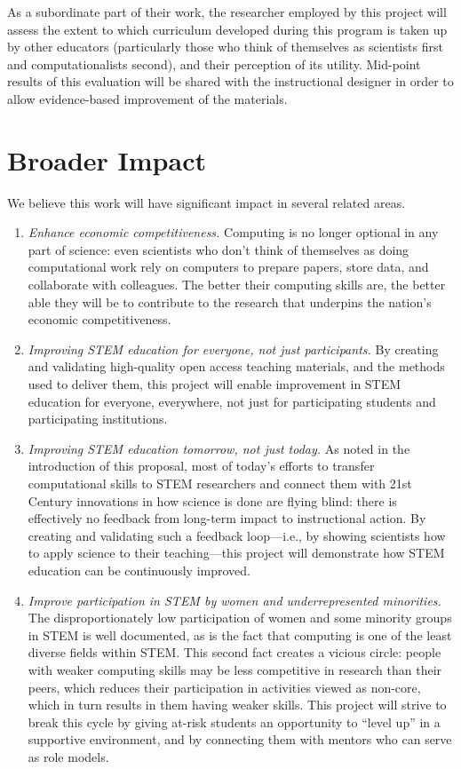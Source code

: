 \documentclass[11pt]{article}
\begin{document}
As a subordinate part of their work, the researcher employed by this
project will assess the extent to which curriculum developed during
this program is taken up by other educators (particularly those who
think of themselves as scientists first and computationalists second),
and their perception of its utility.  Mid-point results of this
evaluation will be shared with the instructional designer in order to
allow evidence-based improvement of the materials.

\section{Broader Impact}

We believe this work will have significant impact in several related
areas.

\begin{enumerate}

\item
  \emph{Enhance economic competitiveness.} Computing is no longer
  optional in any part of science: even scientists who don't think of
  themselves as doing computational work rely on computers to prepare
  papers, store data, and collaborate with colleagues.  The better
  their computing skills are, the better able they will be to
  contribute to the research that underpins the nation's economic
  competitiveness.

\item
  \emph{Improving STEM education for everyone, not just participants.}
  By creating and validating high-quality open access teaching
  materials, and the methods used to deliver them, this project will
  enable improvement in STEM education for everyone, everywhere, not
  just for participating students and participating institutions.

\item
  \emph{Improving STEM education tomorrow, not just today.}  As noted
  in the introduction of this proposal, most of today's efforts to
  transfer computational skills to STEM researchers and connect them
  with 21st Century innovations in how science is done are flying
  blind: there is effectively no feedback from long-term impact to
  instructional action.  By creating and validating such a feedback
  loop---i.e., by showing scientists how to apply science to their
  teaching---this project will demonstrate how STEM education can be
  continuously improved.

\item
  \emph{Improve participation in STEM by women and underrepresented
    minorities.} The disproportionately low participation of women and
  some minority groups in STEM is well documented, as is the fact that
  computing is one of the least diverse fields within STEM.  This
  second fact creates a vicious circle: people with weaker computing
  skills may be less competitive in research than their peers, which
  reduces their participation in activities viewed as non-core, which
  in turn results in them having weaker skills.  This project will
  strive to break this cycle by giving at-risk students an opportunity
  to ``level up'' in a supportive environment, and by connecting them
  with mentors who can serve as role models.


\end{enumerate}
\end{document}
